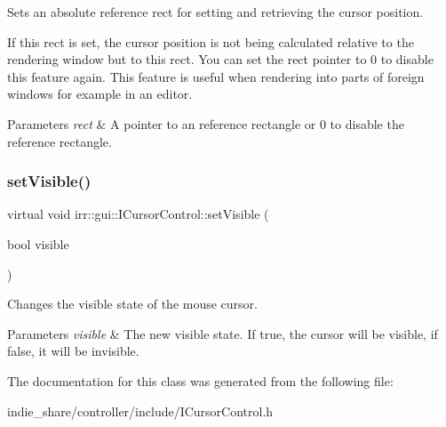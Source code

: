 Sets an absolute reference rect for setting and retrieving the cursor position. 

If this rect is set, the cursor position is not being calculated relative to the rendering window but to this rect. You can set the rect pointer to 0 to disable this feature again. This feature is useful when rendering into parts of foreign windows for example in an editor. 
\begin{DoxyParams}{Parameters}
{\em rect} & A pointer to an reference rectangle or 0 to disable the reference rectangle. \\
\hline
\end{DoxyParams}
\mbox{\label{classirr_1_1gui_1_1ICursorControl_aceb41d68494e2b2076fbc6949b254c74}} 
\subsubsection{\texorpdfstring{set\+Visible()}{setVisible()}}
{\footnotesize\ttfamily virtual void irr\+::gui\+::\+I\+Cursor\+Control\+::set\+Visible (\begin{DoxyParamCaption}\item[{bool}]{visible }\end{DoxyParamCaption})\hspace{0.3cm}{\ttfamily [pure virtual]}}



Changes the visible state of the mouse cursor. 


\begin{DoxyParams}{Parameters}
{\em visible} & The new visible state. If true, the cursor will be visible, if false, it will be invisible. \\
\hline
\end{DoxyParams}


The documentation for this class was generated from the following file\+:\begin{DoxyCompactItemize}
\item 
indie\+\_\+share/controller/include/I\+Cursor\+Control.\+h\end{DoxyCompactItemize}
